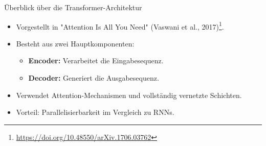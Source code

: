 \documentclass[aspectratio=1610, xcolor=dvipsnames, 9pt]{beamer}
\begin{document}
\begin{frame}{Überblick über die Transformer-Architektur}
  \begin{itemize}
    \item Vorgestellt in "Attention Is All You Need" (Vaswani et al., 2017)\footnote{\url{https://doi.org/10.48550/arXiv.1706.03762}}.
    \item Besteht aus zwei Hauptkomponenten:
      \begin{itemize}
        \item \textbf{Encoder:} Verarbeitet die Eingabesequenz.
        \item \textbf{Decoder:} Generiert die Ausgabesequenz.
      \end{itemize}
    \item Verwendet Attention-Mechanismen und vollständig vernetzte Schichten.
    \item Vorteil: Parallelisierbarkeit im Vergleich zu RNNs.
  \end{itemize}
\end{frame}
\end{document}

